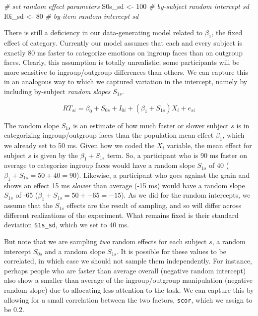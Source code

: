 \documentclass[doc,floatsintext]{apa6}
\newenvironment{Shaded}{\begin{snugshade}}{\end{snugshade}}
\newcommand{\CommentTok}[1]{\textcolor[rgb]{0.56,0.35,0.01}{\textit{#1}}}
\newcommand{\DecValTok}[1]{\textcolor[rgb]{0.00,0.00,0.81}{#1}}
\newcommand{\NormalTok}[1]{#1}
\newcommand{\StringTok}[1]{\textcolor[rgb]{0.31,0.60,0.02}{#1}}
\begin{document}
\begin{Shaded}
\begin{Highlighting}[]
\CommentTok{# set random effect parameters}
\NormalTok{S0s_sd <-}\StringTok{ }\DecValTok{100} \CommentTok{# by-subject random intercept sd}
\NormalTok{I0i_sd <-}\StringTok{  }\DecValTok{80} \CommentTok{# by-item random intercept sd}
\end{Highlighting}
\end{Shaded}

There is still a deficiency in our data-generating model related to \(\beta_1\), the fixed effect of category. Currently our model assumes that each and every subject is exactly 80 ms faster to categorize emotions on ingroup faces than on outgroup faces. Clearly, this assumption is totally unrealistic; some participants will be more sensitive to ingroup/outgroup differences than others. We can capture this in an analogous way to which we captured variation in the intercept, namely by including by-subject \emph{random slopes} \(S_{1s}\).

\begin{equation}
RT_{si} = \beta_0 + S_{0s} + I_{0i} + \left(\beta_1 + S_{1s}\right) X_i + e_{si}
\end{equation}

The random slope \(S_{1s}\) is an estimate of how much faster or slower subject \(s\) is in categorizing ingroup/outgroup faces than the population mean effect \(\beta_1\), which we already set to 50 ms. Given how we coded the \(X_i\) variable, the mean effect for subject \(s\) is given by the \(\beta_1 + S_{1s}\) term. So, a participant who is 90 ms faster on average to categorize ingroup faces would have a random slope \(S_{1s}\) of 40 (\(\beta_1 + S_{1s} = 50 + 40 = 90\)). Likewise, a participant who goes against the grain and shows an effect 15 ms \emph{slower} than average (-15 ms) would have a random slope \(S_{1s}\) of -65 (\(\beta_1 + S_{1s} = 50 + -65 = -15\)). As we did for the random intercepts, we assume that the \(S_{1s}\) effects are the result of sampling, and so will differ across different realizations of the experiment. What remains fixed is their standard deviation \texttt{S1s\_sd}, which we set to 40 ms.

But note that we are sampling \emph{two} random effects for each subject \(s\), a random intercept \(S_{0s}\) and a random slope \(S_{1s}\). It is possible for these values to be correlated, in which case we should not sample them independently. For instance, perhaps people who are faster than average overall (negative random intercept) also show a smaller than average of the ingroup/outgroup manipulation (negative random slope) due to allocating less attention to the task. We can capture this by allowing for a small correlation between the two factors, \texttt{scor}, which we assign to be 0.2.
\end{document}
